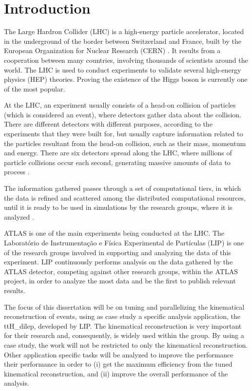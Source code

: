 
\chapter{Introduction}

The Large Hardron Collider (LHC) \cite{CERN:LHC} is a high-energy particle accelerator, located in the underground of the border between Switzerland and France, built by the European Organization for Nuclear Research (CERN) \cite{CERN}. It results from a cooperation between many countries, involving thousands of scientists around the world. The LHC is used to conduct experiments to validate several high-energy physics (HEP) theories. Proving the existence of the Higgs boson is currently one of the most popular.

At the LHC, an experiment usually consists of a head-on collision of particles (which is considered an event), where detectors gather data about the collision. There are different detectors with different purposes, according to the experiments that they were built for, but usually capture information related to the particles resultant from the head-on collision, such as their mass, momentum and energy. There are six detectors spread along the LHC, where millions of particle collisions occur each second, generating massive amounts of data to process \cite{LIP:Ibergrid}.

The information gathered passes through a set of computational tiers, in which the data is refined and scattered among the distributed computational resources, until it is ready to be used in simulations by the research groups, where it is analyzed \cite{CERN:DATA}.

ATLAS \cite{CERN:ATLAS} is one of the main experiments being conducted at the LHC. The Laboratório de Instrumentação e Física Experimental de Partículas (LIP) \cite{LIP} is one of the research groups involved in supporting and analyzing the data of this experiment. LIP continuously performs analysis on the data gathered by the ATLAS detector, competing against other research groups, within the ATLAS project, in order to analyze the most data and be the first to publish relevant results.

The focus of this dissertation will be on tuning and parallelizing the kinematical reconstruction of events, using as case study a specific analysis application, the ttH\_dilep, developed by LIP. The kinematical reconstruction is very important for their research and, consequently, is widely used within the group. By using a case study, the work will not be restricted to only the kinematical reconstruction. Other application specific tasks will be analyzed to improve the performance their performance in order to (i) get the maximum efficiency from the tuned kinematical reconstruction, and (ii) improve the overall performance of the analysis.

